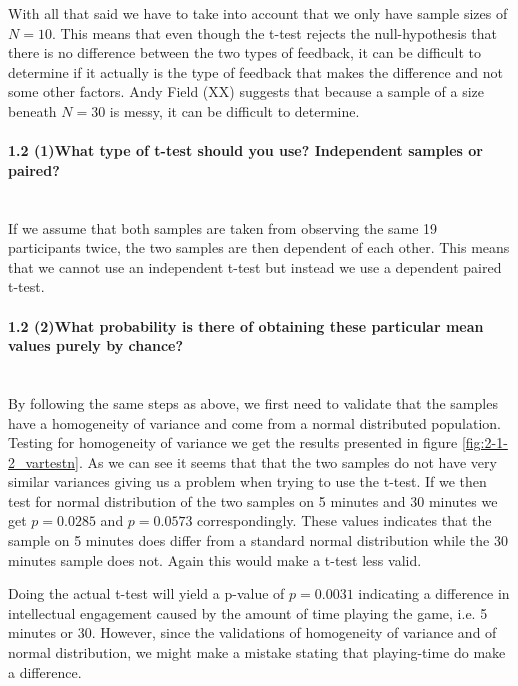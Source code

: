 With all that said we have to take into account that we only have sample sizes of $N=10$. This means that even though the t-test rejects the null-hypothesis that there is no difference between the two types of feedback, it can be difficult to determine if it actually is the type of feedback that makes the difference and not some other factors. Andy Field (XX) suggests that because a sample of a size beneath $N=30$ is messy, it can be difficult to determine.


\paragraph{1.2 (1)What type of t-test should you use? Independent samples or paired?} \hspace{0pt} \\
If we assume that both samples are taken from observing the same 19 participants twice, the two samples are then dependent of each other. This means that we cannot use an independent t-test but instead we use a dependent paired t-test.

\paragraph{1.2 (2)What probability is there of obtaining these particular mean values purely by chance?} \hspace{0pt} \\
By following the same steps as above, we first need to validate that the samples have a homogeneity of variance and come from a normal distributed population. Testing for homogeneity of variance we get the results presented in figure \ref{fig:2-1-2_vartestn}. As we can see it seems that that the two samples do not have very similar variances giving us a problem when trying to use the t-test. If we then test for normal distribution of the two samples on 5 minutes and 30 minutes we get $p=0.0285$ and $p=0.0573$ correspondingly. These values indicates that the sample on 5 minutes does differ from a standard normal distribution while the 30 minutes sample does not. Again this would make a t-test less valid.

Doing the actual t-test will yield a p-value of $p=0.0031$ indicating a difference in intellectual engagement caused by the amount of time playing the game, i.e. 5 minutes or 30. However, since the validations of homogeneity of variance and of normal distribution, we might make a mistake stating that playing-time do make a difference.

